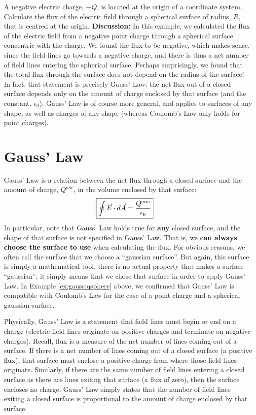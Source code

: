 \begin{example}{A negative electric charge, $-Q$, is located at the origin of a coordinate system. Calculate the flux of the electric field through a spherical surface of radius, $R$, that is centred at the origin.}
\textbf{Discussion: }In this example, we calculated the flux of the electric field from a negative point charge through a spherical surface concentric with the charge. We found the flux to be negative, which makes sense, since the field lines go towards a negative charge, and there is thus a net number of field lines entering the spherical surface. Perhaps surprisingly, we found that the total flux through the surface does not depend on the radius of the surface! In fact, that statement is precisely Gauss' Law: the net flux out of a closed surface depends only on the amount of charge enclosed by that surface (and the constant, $\epsilon_0$). Gauss' Law is of course more general, and applies to surfaces of any shape, as well as charges of any shape (whereas Coulomb's Law only holds for point charges). 
\end{example}

\section{Gauss' Law}
Gauss' Law is a relation between the net flux through a closed surface and the amount of charge, $Q^{enc}$, in the volume enclosed by that surface:
\begin{align*}
\Aboxed{\oint \vec E\cdot d\vec A=\frac{Q^{enc}}{\epsilon_0}}
\end{align*}
In particular, note that Gauss' Law holds true for \textbf{any} closed surface, and the shape of that surface is not specified in Gauss' Law. That is, we \textbf{can always choose the surface to use} when calculating the flux. For obvious reasons, we often call the surface that we choose a ``gaussian surface''. But again, this surface is simply a mathematical tool, there is no actual property that makes a surface ``gaussian''; it simply means that we chose that surface in order to apply Gauss' Law. In Example \ref{ex:gauss:qsphere} above, we confirmed that Gauss' Law is compatible with Coulomb's Law for the case of a point charge and a spherical gaussian surface. 

Physically, Gauss' Law is a statement that field lines must begin or end on a charge (electric field lines originate on positive charges and terminate on negative charges). Recall, flux is a measure of the net number of lines coming out of a surface. If there is a net number of lines coming out of a closed surface (a positive flux), that surface must enclose a positive charge from where those field lines originate. Similarly, if there are the same number of field lines entering a closed surface as there are lines exiting that surface (a flux of zero), then the surface encloses no charge. Gauss' Law simply states that the number of field lines exiting a closed surface is proportional to the amount of charge enclosed by that surface.

